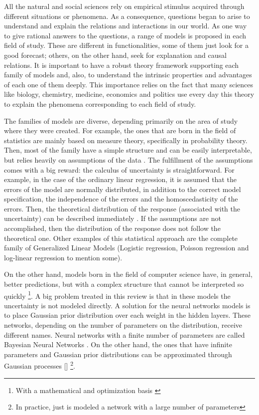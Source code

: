 \documentclass{article}
\begin{document}
All the natural and social sciences rely on empirical stimulus acquired through different situations or phenomena. As a consequence, questions began to arise to understand and explain the relations and interactions in our world. As one way to give rational answers to the questions, a range of models is proposed in each field of study. These are different in functionalities, some of them just look for a good forecast; others, on the other hand, seek for explanation and causal relations. It is important to have a robust theory framework supporting each family of models and, also, to understand the intrinsic properties and advantages of each one of them deeply. This importance relies on the fact that many sciences like biology, chemistry, medicine, economics and politics use every day this theory to explain the phenomena corresponding to each field of study.

The families of models are diverse, depending primarily on the area of study where they were created. For example, the ones that are born in the field of statistics are mainly based on measure theory, specifically in probability theory. Then, most of the family have a simple structure and can be easily interpretable, but relies heavily on assumptions of the data \cite{draper1966applied}. The fulfillment of the assumptions comes with a big reward: the calculus of uncertainty is straightforward. For example, in the case of the ordinary linear regression, it is assumed that the errors of the model are normally distributed, in addition to the correct model specification, the independence of the errors and the homoscedasticity of the errors. Then, the theoretical distribution of the response (associated with the uncertainty) can be described immediately \cite{draper1966applied}. If the assumptions are not accomplished, then the distribution of the response does not follow the theoretical one. Other examples of this statistical approach are the complete family of Generalized Linear Models (Logistic regression, Poisson regression and log-linear regression to mention some).

On the other hand, models born in the field of computer science have, in general, better predictions, but with a complex structure that cannot be interpreted so quickly \cite{bishop1995neural} \footnote{With a mathematical and optimization basis \cite{mcculloch1943logical}}. A big problem treated in this review is that in these models the uncertainty is not modeled directly. A solution for the neural networks models is to place Gaussian prior distribution over each weight in the hidden layers. These networks, depending on the number of parameters on the distribution, receive different names. Neural networks with a finite number of parameters are called Bayesian Neural Networks \cite{bishop1997bayesian}. On the other hand, the ones that have infinite parameters and Gaussian prior distributions can be approximated through Gaussian processes [\cite{neal2012bayesian}] \footnote{In practice, just is modeled a network with a large number of parameters}. 
\end{document}
